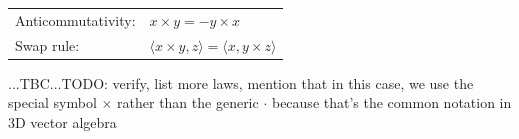 \medskip
\begin{tabular}{l l}
Anticommutativity: & $x \times y = - y \times x  $     \\	
Swap rule:         & $\langle x \times y , z \rangle = \langle x, y \times z \rangle$ 
\end{tabular}
\medskip

...TBC...TODO: verify, list more laws, mention that in this case, we use the special symbol $\times$ rather than the generic $\cdot$ because that's the common notation in 3D vector algebra














